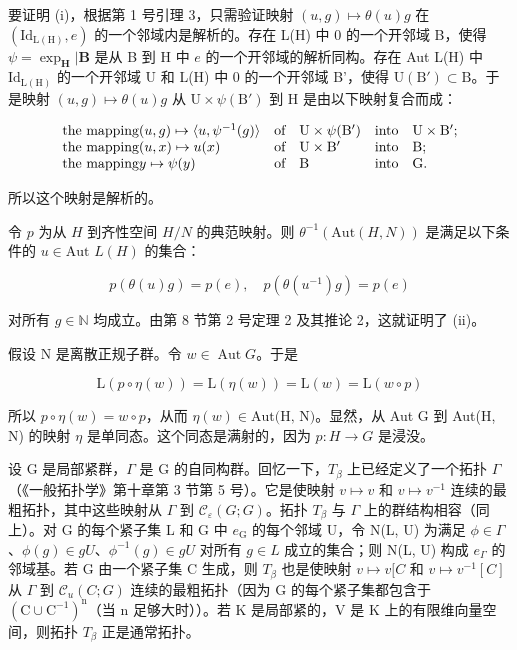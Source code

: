 要证明 (i)，根据第 1 号引理 3，只需验证映射 \((u,g)\mapsto\theta(u)g\) 在 \((\mathrm{Id}_{\mathrm{L(H)}},e)\) 的一个邻域内是解析的。存在 L(H) 中 0 的一个开邻域 B，使得 \(\psi = \exp_{\mathbf{H}}|\mathbf{B}\) 是从 B 到 H 中 \(e\) 的一个开邻域的解析同构。存在 Aut L(H) 中 \(\mathrm{Id}_{\mathrm{L(H)}}\) 的一个开邻域 U 和 L(H) 中 0 的一个开邻域 B'，使得 \(\mathrm{U(B')} \subset \mathrm{B}\)。于是映射 \((u, g) \mapsto \theta(u)g\) 从 \(\mathrm{U} \times \psi(\mathrm{B'})\) 到 H 是由以下映射复合而成：

\[
\begin{array}{l l l l} \text {the mapping} (u, g) \mapsto \langle u, \psi^ {- 1} (g) \rangle & \text {of} & \mathrm{U} \times \psi (\mathrm{B} ^ {\prime}) & \text {into} \quad \mathrm{U} \times \mathrm{B} ^ {\prime}; \\ \text {the mapping} (u, x) \mapsto u (x) & \text {of} & \mathrm{U} \times \mathrm{B} ^ {\prime} & \text {into} \quad \mathrm{B}; \\ \text {the mapping} y \mapsto \psi (y) & \text {of} & \mathrm{B} & \text {into} \quad \mathrm{G}. \end{array}
\]

所以这个映射是解析的。

令 \(p\) 为从 \(H\) 到齐性空间 \(H/N\) 的典范映射。则 \(\theta^{-1}(\text{Aut}(H, N))\) 是满足以下条件的 \(u \in \text{Aut } L(H)\) 的集合：

\[
p (\theta (u) g) = p (e), \quad p (\theta (u ^ {- 1}) g) = p (e)
\]

对所有 \(g \in \mathbb{N}\) 均成立。由第 8 节第 2 号定理 2 及其推论 2，这就证明了 (ii)。

假设 N 是离散正规子群。令 \(w \in \operatorname{Aut} G\)。于是

\[
\mathrm{L} (p \circ \eta (w)) = \mathrm{L} (\eta (w)) = \mathrm{L} (w) = \mathrm{L} (w \circ p)
\]

所以 \(p \circ \eta(w) = w \circ p\)，从而 \(\eta(w) \in \text{Aut(H, N)}\)。显然，从 Aut G 到 Aut(H, N) 的映射 \(\eta\) 是单同态。这个同态是满射的，因为 \(p: H \to G\) 是浸没。

设 G 是局部紧群，\(\Gamma\) 是 G 的自同构群。回忆一下，\(T_{\beta}\) 上已经定义了一个拓扑 \(\Gamma\)（《一般拓扑学》第十章第 3 节第 5 号）。它是使映射 \(v \mapsto v\) 和 \(v \mapsto v^{-1}\) 连续的最粗拓扑，其中这些映射从 \(\Gamma\) 到 \(\mathcal{C}_{\varepsilon}(G; G)\)。拓扑 \(T_{\beta}\) 与 \(\Gamma\) 上的群结构相容（同上）。对 G 的每个紧子集 L 和 G 中 \(e_{\mathrm{G}}\) 的每个邻域 U，令 N(L, U) 为满足 \(\phi \in \Gamma\)、\(\phi(g) \in gU\)、\(\phi^{-1}(g) \in gU\) 对所有 \(g \in L\) 成立的集合；则 N(L, U) 构成 \(e_{\Gamma}\) 的邻域基。若 G 由一个紧子集 C 生成，则 \(T_{\beta}\) 也是使映射 \(v \mapsto v[C\) 和 \(v \mapsto v^{-1}[C]\) 从 \(\Gamma\) 到 \(\mathcal{C}_{u}(C; G)\) 连续的最粗拓扑（因为 G 的每个紧子集都包含于 \((\mathrm{C} \cup \mathrm{C}^{-1})^{\mathrm{n}}\)（当 n 足够大时））。若 K 是局部紧的，V 是 K 上的有限维向量空间，则拓扑 \(T_{\beta}\) 正是通常拓扑。

